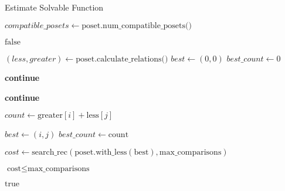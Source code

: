 \documentclass[a4paper]{article}
\begin{document}
\begin{algorithm}
    \caption{Estimate Solvable Function}
    \begin{algorithmic}[1]
        \State $compatible\_posets \gets \text{poset.num\_compatible\_posets()}$

        \State \Return $\text{false}$
        \EndIf
        \State

        \State $(less, greater) \gets \text{poset.calculate\_relations()}$
        \State $best \gets (0, 0)$
        \State $best\_count \gets 0$
        \State

        \State \textbf{continue}
        \EndIf
        \State

        \State \textbf{continue}
        \EndIf
        \State

        \State $count \gets \text{greater}[i] + \text{less}[j]$

        \State $best \gets (i, j)$
        \State $best\_count\gets \text{count}$
        \EndIf
        \EndFor
        \EndFor
        \State

        \State $cost \gets \text{search\_rec}(\text{poset.with\_less}(\text{best}), \text{max\_comparisons})$

        \State \Return $\text{cost} \le \text{max\_comparisons}$
        \EndIf
        \State

        \State \Return $\text{true}$
        \EndFunction
    \end{algorithmic}
\end{algorithm}
\end{document}

